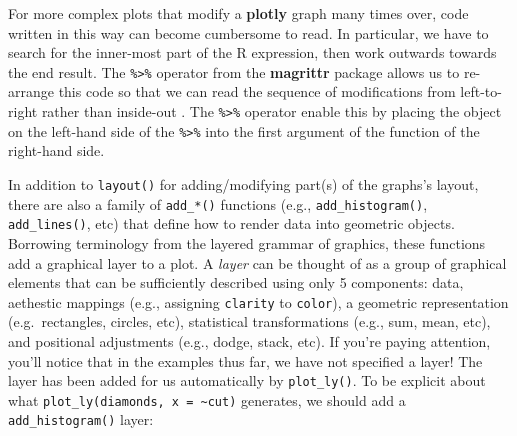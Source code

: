 \documentclass[
  12pt,
]{krantz}
\newenvironment{Shaded}{\begin{snugshade}}{\end{snugshade}}
\newcommand{\DataTypeTok}[1]{\textcolor[rgb]{0.13,0.29,0.53}{#1}}
\newcommand{\KeywordTok}[1]{\textcolor[rgb]{0.13,0.29,0.53}{\textbf{#1}}}
\newcommand{\NormalTok}[1]{#1}
\newcommand{\OperatorTok}[1]{\textcolor[rgb]{0.81,0.36,0.00}{\textbf{#1}}}
\newcommand{\StringTok}[1]{\textcolor[rgb]{0.31,0.60,0.02}{#1}}
\begin{document}
For more complex plots that modify a \textbf{plotly} graph many times over, code written in this way can become cumbersome to read. In particular, we have to search for the inner-most part of the R expression, then work outwards towards the end result. The \texttt{\%\textgreater{}\%} operator from the \textbf{magrittr} package allows us to re-arrange this code so that we can read the sequence of modifications from left-to-right rather than inside-out \citep{magrittr}. The \texttt{\%\textgreater{}\%} operator enable this by placing the object on the left-hand side of the \texttt{\%\textgreater{}\%} into the first argument of the function of the right-hand side.

\begin{Shaded}
\end{Shaded}

In addition to \texttt{layout()} for adding/modifying part(s) of the graphs's layout, there are also a family of \texttt{add\_*()} functions (e.g., \texttt{add\_histogram()}, \texttt{add\_lines()}, etc) that define how to render data into geometric objects. Borrowing terminology from the layered grammar of graphics, these functions add a graphical layer to a plot. A \emph{layer} can be thought of as a group of graphical elements that can be sufficiently described using only 5 components: data, aethestic mappings (e.g., assigning \texttt{clarity} to \texttt{color}), a geometric representation (e.g.~rectangles, circles, etc), statistical transformations (e.g., sum, mean, etc), and positional adjustments (e.g., dodge, stack, etc). If you're paying attention, you'll notice that in the examples thus far, we have not specified a layer! The layer has been added for us automatically by \texttt{plot\_ly()}. To be explicit about what \texttt{plot\_ly(diamonds,\ x\ =\ \textasciitilde{}cut)} generates, we should add a \texttt{add\_histogram()} layer:

\begin{Shaded}
\end{Shaded}
\end{document}

